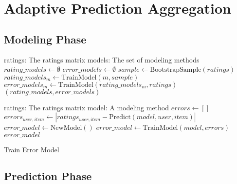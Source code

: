 \section{Adaptive Prediction Aggregation}

\subsection{Modeling Phase}

\begin{algorithm}
  \begin{algorithmic}[1]
  \REQUIRE ratings: The ratings matrix
  \REQUIRE models: The set of modeling methods
  \ENSURE
    \STATE $rating\_models \gets \emptyset$
    \STATE $error\_models \gets \emptyset$
      \STATE $sample \gets \mathrm{BootstrapSample}(ratings)$
      \STATE $rating\_models_m \gets \mathrm{TrainModel}(m, sample)$
      \STATE $error\_models_m  \gets \mathrm{TrainModel}(rating\_models_m, ratings)$
    \ENDFOR 
  \RETURN $(rating\_models, error\_models)$
  \end{algorithmic}
  \caption[Training]{Training
  }
  \label{code:training}
\end{algorithm}



\begin{algorithm}
  \begin{algorithmic}[1]
  \REQUIRE ratings: The ratings matrix
  \REQUIRE model: A modeling method
  \ENSURE
    \STATE $errors \gets []$
        \STATE $errors_{user,item} \gets | ratings_{user,item} - \mathrm{Predict}(model, user, item) |$
    \ENDFOR 
    \STATE $error\_model \gets \mathrm{NewModel}()$
    \STATE $error\_model \gets \mathrm{TrainModel}(model, errors)$
  \RETURN $error\_model$
  \end{algorithmic}
  \caption[Training Error Model]{Train Error Model}
  \label{code:trainerrormodel}
\end{algorithm}







\subsection{Prediction Phase}

